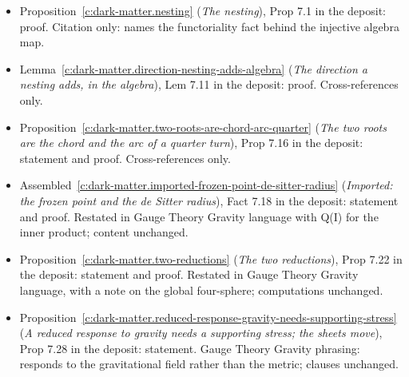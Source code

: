 \documentclass[11pt]{article}
\theoremstyle{definition}
\theoremstyle{plain}
\begin{document}
\begin{itemize}
\item Proposition~\ref{c:dark-matter.nesting} (\emph{The nesting}), Prop 7.1 in the deposit: proof. Citation only: names the functoriality fact behind the injective algebra map.
\item Lemma~\ref{c:dark-matter.direction-nesting-adds-algebra} (\emph{The direction a nesting adds, in the algebra}), Lem 7.11 in the deposit: proof. Cross-references only.
\item Proposition~\ref{c:dark-matter.two-roots-are-chord-arc-quarter} (\emph{The two roots are the chord and the arc of a quarter turn}), Prop 7.16 in the deposit: statement and proof. Cross-references only.
\item Assembled~\ref{c:dark-matter.imported-frozen-point-de-sitter-radius} (\emph{Imported: the frozen point and the de Sitter radius}), Fact 7.18 in the deposit: statement and proof. Restated in Gauge Theory Gravity language with Q(I) for the inner product; content unchanged.
\item Proposition~\ref{c:dark-matter.two-reductions} (\emph{The two reductions}), Prop 7.22 in the deposit: statement and proof. Restated in Gauge Theory Gravity language, with a note on the global four-sphere; computations unchanged.
\item Proposition~\ref{c:dark-matter.reduced-response-gravity-needs-supporting-stress} (\emph{A reduced response to gravity needs a supporting stress; the sheets move}), Prop 7.28 in the deposit: statement. Gauge Theory Gravity phrasing: responds to the gravitational field rather than the metric; clauses unchanged.
\end{itemize}
\end{document}
